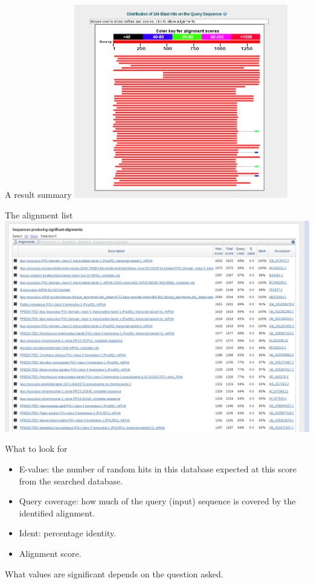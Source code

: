 \documentclass[pdf]{beamer}
\begin{document}
\begin{frame}{A result summary}
  \includegraphics[width=0.7\textwidth]{images/blast_graphical_overview.png}
\end{frame}

\begin{frame}{The alignment list}
  \includegraphics[width=\textwidth]{images/blast_result_list}
\end{frame}

\begin{frame}{What to look for}
  \begin{itemize}
  \item E-value: the number of random hits in this database expected at this
    score from the searched database.
  \item Query coverage: how much of the query (input) sequence is covered by
    the identified alignment.
  \item Ident: percentage identity.
  \item Alignment score.
  \end{itemize}

  What values are significant depends on the question asked.
\end{frame}
\end{document}
